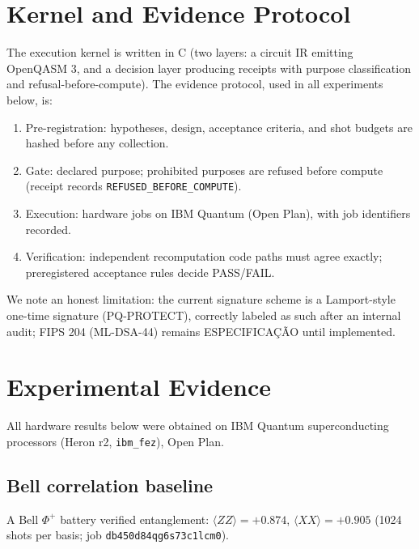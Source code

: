 \documentclass[11pt]{article}
\begin{document}
\section{Kernel and Evidence Protocol}
The execution kernel is written in C (two layers: a circuit IR emitting OpenQASM 3, and a decision layer producing receipts with purpose classification and refusal-before-compute). The evidence protocol, used in all experiments below, is:
\begin{enumerate}
\item Pre-registration: hypotheses, design, acceptance criteria, and shot budgets are hashed before any collection.
\item Gate: declared purpose; prohibited purposes are refused before compute (receipt records \texttt{REFUSED\_BEFORE\_COMPUTE}).
\item Execution: hardware jobs on IBM Quantum (Open Plan), with job identifiers recorded.
\item Verification: independent recomputation code paths must agree exactly; preregistered acceptance rules decide PASS/FAIL.
\end{enumerate}
We note an honest limitation: the current signature scheme is a Lamport-style one-time signature (PQ-PROTECT), correctly labeled as such after an internal audit; FIPS 204 (ML-DSA-44) remains ESPECIFICA\c{C}\~AO until implemented.

\section{Experimental Evidence}
All hardware results below were obtained on IBM Quantum superconducting processors (Heron r2, \texttt{ibm\_fez}), Open Plan.

\subsection{Bell correlation baseline}
A Bell $\Phi^+$ battery verified entanglement: $\langle ZZ\rangle = +0.874$, $\langle XX\rangle = +0.905$ (1024 shots per basis; job \texttt{db450d84qg6s73c1lcm0}).
\end{document}
